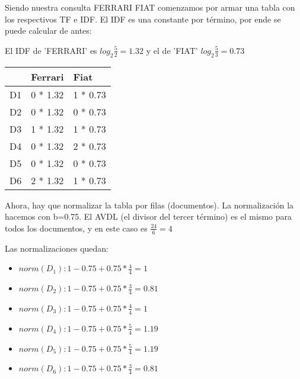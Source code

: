 \documentclass[a4paper]{article}
\begin{document}
    Siendo nuestra consulta FERRARI FIAT comenzamos por armar una tabla con los respectivos {\color{green}TF} e {\color{red}IDF}. El IDF es una constante por término, por ende se puede calcular de antes: 
    
    El IDF de 'FERRARI' es $log_2{\frac{5}{2}} = 1.32$ y el de 'FIAT' $log_2{\frac{5}{3}} = 0.73$

    \begin{table}[H]
        \begin{tabular}{|l|l|l|}
        \hline
         & Ferrari & Fiat   \\
        \hline
        D1 & {\color{green}0} * {\color{red}1.32}  & {\color{green}1} * {\color{red}0.73}  \\
        D2 & {\color{green}0} * {\color{red}1.32}  & {\color{green}0} * {\color{red}0.73}  \\
        D3 & {\color{green}1} * {\color{red}1.32}  & {\color{green}1} * {\color{red}0.73}  \\
        D4 & {\color{green}0} * {\color{red}1.32}  & {\color{green}2} * {\color{red}0.73}  \\
        D5 & {\color{green}0} * {\color{red}1.32}  & {\color{green}0} * {\color{red}0.73}  \\
        D6 & {\color{green}2} * {\color{red}1.32}  & {\color{green}1} * {\color{red}0.73}  \\
        \hline
        \end{tabular}
    \end{table}

    Ahora, hay que normalizar la tabla por filas (documentos). La normalización la hacemos con b=0.75. El AVDL (el divisor del tercer término) es el mismo para todos los documentos, y en este caso es $\frac{24}{6}=4$
    
    Las normalizaciones quedan:

    \begin{itemize}
        \item $norm(D_1): 1-0.75+0.75*\frac{4}{4} = 1$
        \item $norm(D_2): 1-0.75+0.75*\frac{3}{4} = 0.81$
        \item $norm(D_3): 1-0.75+0.75*\frac{4}{4} = 1$
        \item $norm(D_4): 1-0.75+0.75*\frac{5}{4} = 1.19$
        \item $norm(D_5): 1-0.75+0.75*\frac{5}{4} = 1.19$
        \item $norm(D_6): 1-0.75+0.75*\frac{3}{4} = 0.81$
    \end{itemize}
    
\end{document}
